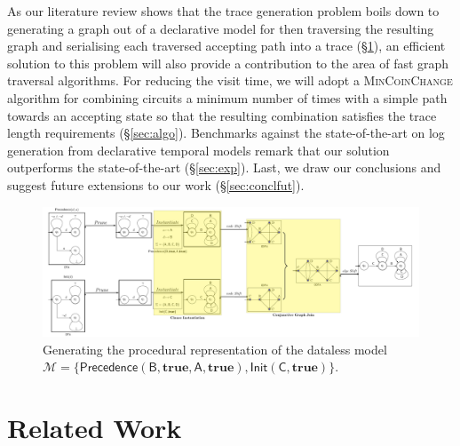 \documentclass[acmengage]{acmart}
\begin{document}
As our literature review shows that the trace generation problem boils down to  generating a graph out of a declarative model for then traversing the resulting graph and serialising each traversed accepting path into a trace (\S\ref{sec:RW}), an efficient solution to this problem will also provide a contribution to the area of fast graph traversal algorithms. For reducing the visit time, we will adopt a \textsc{MinCoinChange} algorithm for combining circuits a minimum number of times with a simple path towards an accepting state so that the resulting combination satisfies the trace length requirements (\S\ref{sec:algo}). Benchmarks against the state-of-the-art on log generation from declarative temporal models remark that our solution outperforms the state-of-the-art (\S\ref{sec:exp}). Last, we draw our conclusions and suggest future extensions to our work (\S\ref{sec:conclfut}).


\begin{figure}[!t]
\hspace*{-.25cm}
\includegraphics[width=\linewidth]{fig/transform}
\caption{Generating the procedural representation of the dataless model $\mathcal{M}=\{\textsf{Precedence}(\textsf{B},\textbf{true},\textsf{A},\textbf{true}),\textsf{Init}(\textsf{C},\textbf{true})\}$.}\label{fig:transform}
\end{figure}
\section{Related Work}\label{sec:RW}
\end{document}
